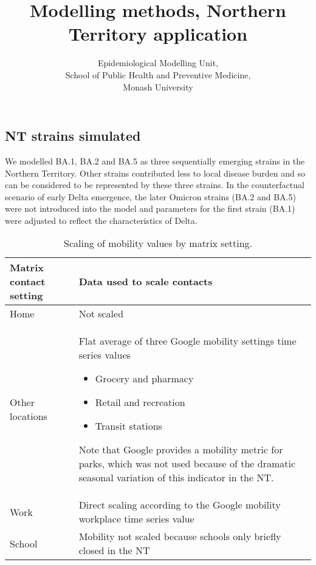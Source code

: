 \documentclass{article}
\author{
    Epidemiological Modelling Unit,
    \\ School of Public Health and Preventive Medicine,
    \\ Monash University
}
\title{Modelling methods, Northern Territory application}
\begin{document}
\maketitle
\tableofcontents
\newpage






\subsection{NT strains simulated}
We modelled BA.1, BA.2 and BA.5 as three sequentially emerging strains
in the Northern Territory.
Other strains contributed less to local disease burden 
and so can be considered to be represented by these three strains.
In the counterfactual scenario of early Delta emergence,
the later Omicron strains (BA.2 and BA.5) were not introduced into the model
and parameters for the first strain (BA.1) were adjusted
to reflect the characteristics of Delta.



\begin{table}[h]
    \begin{threeparttable}
    \begin{tabularx}{\textwidth}{| X | X |}
        \hline
        \textbf{Matrix contact setting} & \textbf{Data used to scale contacts} \\
        \hline
        Home & Not scaled \\
        \hline
        Other locations & 
        Flat average of three Google mobility settings time series values
        \begin{itemize}
            \item Grocery and pharmacy
            \item Retail and recreation
            \item Transit stations
        \end{itemize}
        Note that Google provides a mobility metric for parks, 
        which was not used because of the dramatic seasonal variation of this indicator
        in the NT.
        \\
        \hline
        Work & Direct scaling according to the Google mobility workplace time series value \\
        \hline
        School & Mobility not scaled because schools only briefly closed in the NT \\
        \hline
	\end{tabularx}
	\caption{Scaling of mobility values by matrix setting.}
	\label{tab:location_scaling}
    \end{threeparttable}
\end{table}
\end{document}
